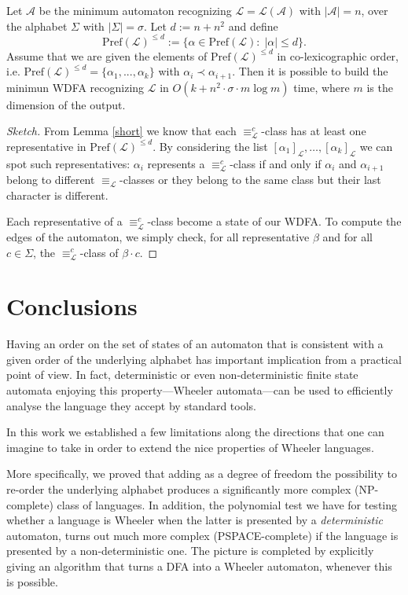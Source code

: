 \documentclass[runningheads]{llncs}
\newcommand{\pf}[1]{\text{Pref}(\mathcal #1)}
\newcommand{\la}[1]{\mathcal L(\mathcal #1)}
\begin{document}
\begin{proposition}
\label{DFA to WDFA}
Let $\mathcal A$ be the minimum automaton recognizing $\mathcal L = \la A$ with $| \mathcal A | = n$, over the alphabet $\Sigma$ with $|\Sigma|=\sigma$. Let $d:= n + n^2$ and define 
\[ \pf L^{\le d} := \{\alpha \in \pf L: \; |\alpha| \le d \}. \] 
Assume that we are given the elements of $\pf L^{\le d}$ in co-lexicographic order, i.e. $\pf L^{\le d} = \{ \alpha_1, ..., \alpha_k \}$ with $\alpha_i \prec \alpha_{i+1}$. Then it is possible to build the minimun WDFA recognizing $\mathcal L$ in $O(k+n^2\cdot\sigma\cdot m\log m)$ time, where $m$ is the dimension of the output.
\end{proposition}
\begin{proof}[Sketch]
From Lemma \ref{short} we know that each $\equiv_\mathcal L^c$-class has at least one representative in $\pf L^{\le d}$. By considering the list $[\alpha_1]_\mathcal L, \dots, [\alpha_k]_\mathcal L$ we can spot such representatives: $\alpha_i$ represents a $\equiv_\mathcal L^c$-class if and only if $\alpha_i$ and $\alpha_{i+1}$ belong to different $\equiv_\mathcal L$-classes or they belong to the same class but their last character is different. 

Each representative of a $\equiv_\mathcal L^c$-class become a state of our WDFA. To compute the edges of the automaton, we simply check, for all representative $\beta$ and for all $c \in \Sigma$, the $\equiv_\mathcal L^c$-class of $\beta \cdot c$.
\end{proof}


\section{Conclusions}

Having an order on the set of states of an automaton that is consistent with a given order of the underlying alphabet  has important implication from a practical point of view. In fact, deterministic or even non-deterministic finite state automata enjoying this property---Wheeler automata---can be used to efficiently analyse the language they accept by standard tools. 

In this work we established a few limitations along the directions that one can imagine to take in order to extend the nice properties of Wheeler languages.

More specifically, we proved that adding as a degree of freedom the possibility to re-order the underlying alphabet produces a significantly more complex (NP-complete) class of languages.  In addition, the polynomial test we have for testing whether a language is Wheeler when the latter is presented by a \emph{deterministic} automaton, turns out much more complex (PSPACE-complete) if the language is presented by a non-deterministic one. The picture is completed by explicitly giving an algorithm that turns a DFA into a Wheeler automaton, whenever this is possible.
\end{document}
